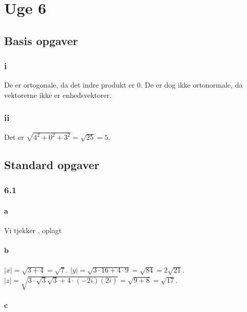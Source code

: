 
\chapter{Uge 6}

	\section{Basis opgaver}

		\subsection{i}

			De er ortogonale, da det indre produkt er 0. De er dog ikke ortonormale, da vektorerne ikke er enhedsvektorer.

		\subsection{ii}

			Det er $\sqrt{4^2+0^2+3^2}=\sqrt{25}=5$.

	\section{Standard opgaver}

		\subsection{6.1}

			\subsubsection{a}

				Vi tjekker \cite[Definition 6.1.1]{hesselholt2017}, oplagt

			\subsubsection{b}

				$|x|=\sqrt{3+4}=\sqrt{7}$. $|y|=\sqrt{3\cdot 16+ 4 \cdot 9}=\sqrt{84}=2\sqrt{21}$. $|z|=\sqrt{3\cdot \sqrt{3}\sqrt{3} + 4\cdot (-2i)(2i)}=\sqrt{9 + 8}=\sqrt{17}$.

			\subsubsection{c}

